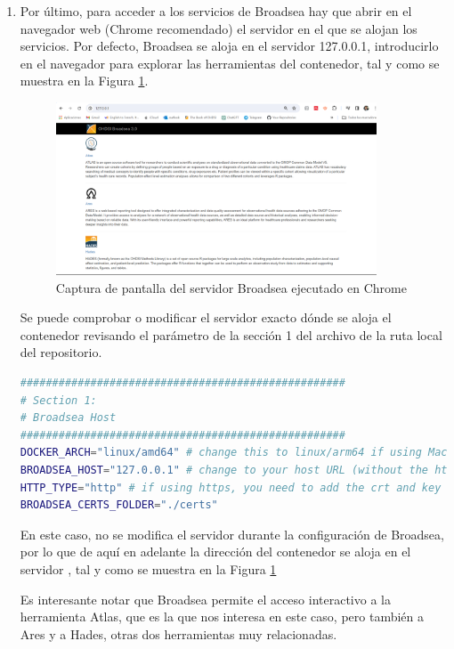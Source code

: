 \begin{enumerate}
    \item Por último, para acceder a los servicios de Broadsea hay que abrir en el navegador web (Chrome recomendado) el servidor en el que se alojan los servicios. Por defecto, Broadsea se aloja en el servidor 127.0.0.1, introducirlo en el navegador para explorar las herramientas del contenedor, tal y como se muestra en la Figura \ref{fig:broadseaCap}.

    \begin{figure}[H]
    \centering
    \includegraphics[width=0.90\textwidth]{figures/broadseaCap.png}
     \caption{Captura de pantalla del servidor Broadsea ejecutado en Chrome}
    \label{fig:broadseaCap}
\end{figure}
    
    Se puede comprobar o modificar el servidor exacto dónde se aloja el contenedor revisando el parámetro  de la sección 1 del archivo  de la ruta local del repositorio. 

\begin{lstlisting}[language=sh]
###################################################
# Section 1:
# Broadsea Host
###################################################
DOCKER_ARCH="linux/amd64" # change this to linux/arm64 if using Mac Silicon, otherwise keep as-is
BROADSEA_HOST="127.0.0.1" # change to your host URL (without the http part)
HTTP_TYPE="http" # if using https, you need to add the crt and key files to the ./certs folder
BROADSEA_CERTS_FOLDER="./certs" 
\end{lstlisting}

    En este caso, no se modifica el servidor durante la configuración de Broadsea, por lo que de aquí en adelante la dirección del contenedor se aloja en el servidor , tal y como se muestra en la Figura \ref{fig:broadseaCap}
   



    Es interesante notar que Broadsea permite el acceso interactivo a la herramienta Atlas, que es la que nos interesa en este caso, pero también a Ares y a Hades, otras dos herramientas muy relacionadas.


\end{enumerate}
